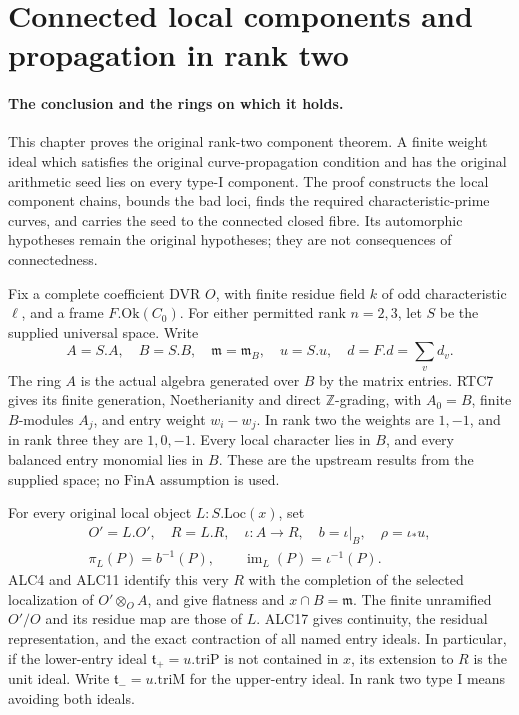 \documentclass[11pt,a4paper]{article}
\numberwithin{equation}{section}
\theoremstyle{remark}\newtheorem{remark}[theorem]{Remark}
\begin{document}
\clearpage
\section{Connected local components and propagation in rank two}
\label{sec:arithmetic-connectedness}

\paragraph{The conclusion and the rings on which it holds.}
This chapter proves the original rank-two component theorem.  A finite
weight ideal which satisfies the original curve-propagation condition
and has the original arithmetic seed lies on every type-I component.
The proof constructs the local component chains, bounds the bad loci,
finds the required characteristic-prime curves, and carries the seed
to the connected closed fibre.  Its automorphic hypotheses remain the
original hypotheses; they are not consequences of connectedness.

Fix a complete coefficient DVR \(O\), with finite residue field
\(k\) of odd characteristic \(\ell\), and a frame
\(F.\mathrm{Ok}(C_0)\).  For either permitted rank \(n=2,3\),
let \(S\) be the supplied universal space.  Write
\[
 A=S.A,\quad B=S.B,\quad \mathfrak m=\mathfrak m_B,
 \quad u=S.u,\quad d=F.d=\sum_v d_v.
                                                        \tag{ACC.1}
\]
The ring \(A\) is the actual algebra generated over \(B\) by the
matrix entries.  RTC7 gives its finite generation, Noetherianity and
direct \(\mathbb Z\)-grading, with \(A_0=B\), finite \(B\)-modules
\(A_j\), and entry weight \(w_i-w_j\).  In rank two the weights
are \(1,-1\), and in rank three they are \(1,0,-1\).
Every local character lies in \(B\), and every balanced entry monomial
lies in \(B\).  These are the upstream results from the supplied
space; no \(\mathrm{FinA}\) assumption is used.

For every original local object \(L:S.\mathrm{Loc}(x)\), set
\[
 \begin{gathered}
 O'=L.O',\quad R=L.R,\quad \iota:A\longrightarrow R,
 \quad b=\iota|_B,\quad \rho=\iota_*u,\\
 \pi_L(P)=b^{-1}(P),\qquad \operatorname{im}_L(P)=\iota^{-1}(P).
 \end{gathered}
                                                        \tag{ACC.2}
\]
ALC4 and ALC11 identify this very \(R\) with the completion of the
selected localization of \(O'\otimes_O A\), and give flatness and
\(x\cap B=\mathfrak m\).  The finite unramified \(O'/O\) and
its residue map are those of \(L\).  ALC17 gives continuity, the
residual representation, and the exact contraction of all named
entry ideals.  In particular, if the lower-entry ideal
\(\mathfrak t_+=u.\mathrm{triP}\) is not contained in \(x\),
its extension to \(R\) is the unit ideal.  Write
\(\mathfrak t_-=u.\mathrm{triM}\) for the upper-entry ideal.
In rank two type I means avoiding both ideals.
\end{document}
